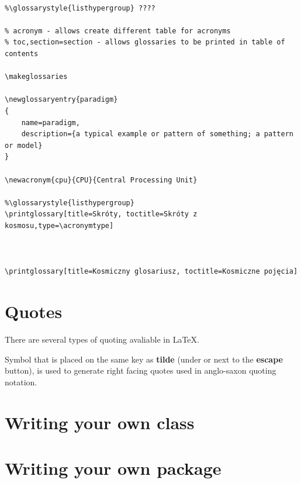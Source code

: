 \begin{verbatim}

%\glossarystyle{listhypergroup} ????

% acronym - allows create different table for acronyms
% toc,section=section - allows glossaries to be printed in table of contents

\makeglossaries

\newglossaryentry{paradigm}
{
    name=paradigm,
    description={a typical example or pattern of something; a pattern or model}
}

\newacronym{cpu}{CPU}{Central Processing Unit}

%\glossarystyle{listhypergroup}
\printglossary[title=Skróty, toctitle=Skróty z kosmosu,type=\acronymtype]



\printglossary[title=Kosmiczny glosariusz, toctitle=Kosmiczne pojęcia] 
\end{verbatim}

\section{Quotes}

There are several types of quoting avaliable in \LaTeX.

Symbol that is placed on the same key as \textbf{tilde} (under or next to the \textbf{escape} button), is used to generate right facing quotes used in anglo-saxon quoting notation.

\fbox{\textcolor{red}{To finish}}

\section{Writing your own class}

\fbox{\textcolor{red}{To be implemented}}

\section{Writing your own package}

\fbox{\textcolor{red}{To be implemented}}


